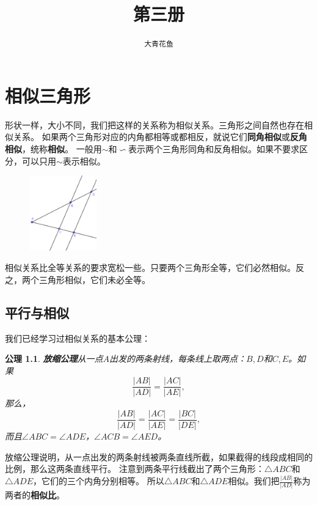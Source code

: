 \documentclass[12pt,UTF8]{ctexbook}
\title{\zihao{0} \bfseries 第三册}
\author{\zihao{2} \texttt{大青花鱼}}
\date{}
\newtheorem{po}{公理}
\begin{document}
\maketitle
\tableofcontents
\newpage

\chapter{相似三角形}
形状一样，大小不同，我们把这样的关系称为相似关系。三角形之间自然也存在相似关系。
如果两个三角形对应的内角都相等或都相反，就说它们\textbf{同角相似}或\textbf{反角相似}，统称\textbf{相似}。
一般用$\sim$和$\backsim$表示两个三角形同角和反角相似。如果不要求区分，可以只用$\sim$表示相似。

\begin{figure} %
    \vspace{-26pt}
    \includegraphics[width=0.26\textwidth]{tu/比例1.png}
\end{figure}

相似关系比全等关系的要求宽松一些。只要两个三角形全等，它们必然相似。反之，两个三角形相似，它们未必全等。

\section{平行与相似}
我们已经学习过相似关系的基本公理：
\begin{po}{\textbf{放缩公理}}\label{po:6}
    从一点$A$出发的两条射线，每条线上取两点：$B,D$和$C,E$。如果
    $$ \frac{|AB|}{|AD|} = \frac{|AC|}{|AE|},$$
    那么，
    $$ \frac{|AB|}{|AD|} = \frac{|AC|}{|AE|} = \frac{|BC|}{|DE|},$$
    而且$\angle ABC = \angle ADE$，$\angle ACB = \angle AED$。
\end{po}

放缩公理说明，从一点出发的两条射线被两条直线所截，如果截得的线段成相同的比例，那么这两条直线平行。
注意到两条平行线截出了两个三角形：$\triangle ABC$和$\triangle ADE$，它们的三个内角分别相等。
所以$\triangle ABC$和$\triangle ADE$相似。我们把$\frac{|AB|}{|AD|}$称为两者的\textbf{相似比}。

\end{document}
